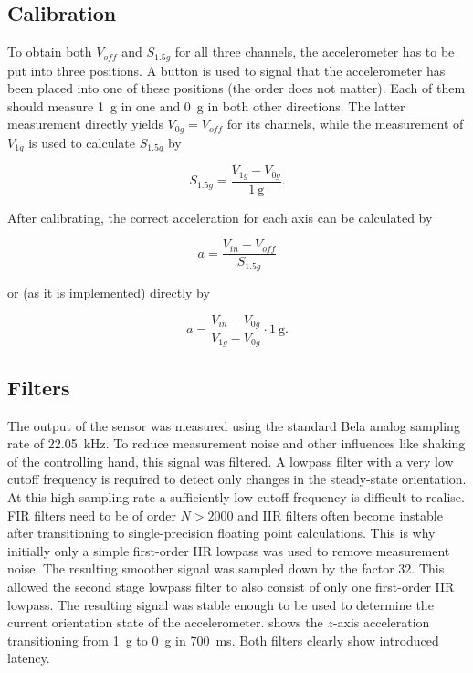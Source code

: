 \documentclass[a4paper, 12pt]{article}
\begin{document}
\subsection{Calibration} \label{sec:calibration}
To obtain both $V_{off}$ and $S_{1.5g}$ for all three channels, the accelerometer has to be put into three positions. A button is used to signal that the accelerometer has been placed into one of these positions (the order does not matter). Each of them should measure \SI{+1}{\gram} in one and \SI{0}{\gram} in both other directions. The latter measurement directly yields $V_{0g} = V_{off}$ for its channels, while the measurement of $V_{1g}$ is used to calculate $S_{1.5g}$ by

\begin{equation}
	S_{1.5g} = \frac{V_{1g} - V_{0g}}{\SI{1}{\gram}}.
\end{equation}

After calibrating, the correct acceleration for each axis can be calculated by

\begin{equation}
	a = \frac{V_{in} - V_{off}}{S_{1.5g}}
\end{equation}

or (as it is implemented) directly by

\begin{equation}
	a = \frac{V_{in} - V_{0g}}{V_{1g} - V_{0g}} \cdot \SI{1}{\gram}.
\end{equation}

\subsection{Filters}
The output of the sensor was measured using the standard Bela analog sampling rate of \SI{22.05}{\kilo\hertz}. To reduce measurement noise and other influences like shaking of the controlling hand, this signal was filtered. A lowpass filter with a very low cutoff frequency is required to detect only changes in the steady-state orientation. At this high sampling rate a sufficiently low cutoff frequency is difficult to realise. FIR filters need to be of order $N>2000$ and IIR filters often become instable after transitioning to single-precision floating point calculations. This is why initially only a simple first-order IIR lowpass was used to remove measurement noise. The resulting smoother signal was sampled down by the factor $32$. This allowed the second stage lowpass filter to also consist of only one first-order IIR lowpass. The resulting signal was stable enough to be used to determine the current orientation state of the accelerometer.  shows the $z$-axis acceleration transitioning from \SI{1}{\gram} to \SI{0}{\gram} in \SI{700}{\milli\second}. Both filters clearly show introduced latency.
\end{document}
